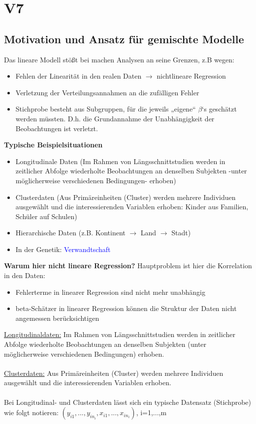 \section{V7}
\subsection{Motivation und Ansatz für gemischte Modelle}
Das lineare Modell stößt bei machen Analysen an seine Grenzen, z.B wegen:
\begin{itemize}
	\item Fehlen der Linearität in den realen Daten $\rightarrow$ nichtlineare Regression
	\item Verletzung der Verteilungsannahmen an die zufälligen Fehler
	\item Stichprobe besteht aus Subgruppen, für die jeweils „eigene“ $\beta$‘s geschätzt werden müssten. D.h. die Grundannahme der Unabhängigkeit der Beobachtungen ist verletzt.
\end{itemize}

\textbf{Typische Beispielsituationen}
\begin{itemize}
	\item Longitudinale Daten (Im Rahmen von Längsschnittstudien werden in zeitlicher Abfolge wiederholte Beobachtungen an denselben Subjekten -unter möglicherweise verschiedenen Bedingungen- erhoben)
	\item Clusterdaten (Aus Primäreinheiten (Cluster) werden mehrere Individuen ausgewählt und die interessierenden Variablen erhoben: Kinder aus Familien, Schüler auf Schulen)
	\item Hierarchische Daten (z.B. Kontinent $\rightarrow$ Land $\rightarrow$ Stadt)
	\item In der Genetik: \textcolor{blue}{Verwandtschaft}
\end{itemize}

\textbf{Warum hier nicht lineare Regression?}
Hauptproblem ist hier die Korrelation in den Daten:
\begin{itemize}
	\item Fehlerterme in linearer Regression sind nicht mehr unabhängig
	\item beta-Schätzer in linearer Regression können die Struktur der Daten nicht angemessen berücksichtigen
\end{itemize}

\underline{Longitudinaldaten:} Im Rahmen von Längsschnittstudien werden in zeitlicher Abfolge wiederholte Beobachtungen an denselben Subjekten (unter möglicherweise verschiedenen Bedingungen) erhoben.
\\\\
\underline{Clusterdaten:} Aus Primäreinheiten (Cluster) werden mehrere Individuen ausgewählt und die interessierenden Variablen erhoben.
\\\\
Bei Longitudinal- und Clusterdaten lässt sich ein typische Datensatz (Stichprobe) wie folgt notieren: $(y_{i1}, ... , y_{in_i}, x_{i1}, ..., x_{in_i})$, i=1,...,m


